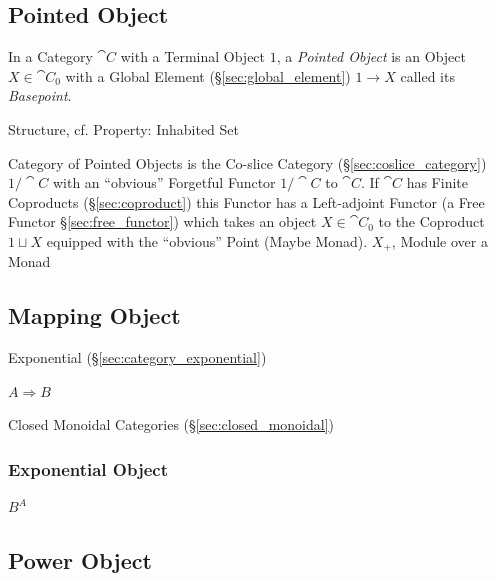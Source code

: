 \subsection{Pointed Object}\label{sec:pointed_object}

In a Category $\cat{C}$ with a Terminal Object $1$, a \emph{Pointed Object} is
an Object $X \in \cat{C}_0$ with a Global Element (\S\ref{sec:global_element})
$1 \rightarrow X$ called its \emph{Basepoint}.

Structure, cf. Property: Inhabited Set %

Category of Pointed Objects is the Co-slice Category
(\S\ref{sec:coslice_category}) $1/\cat{C}$ with an ``obvious'' Forgetful
Functor $1 / \cat{C}$ to $\cat{C}$. If $\cat{C}$ has Finite Coproducts
(\S\ref{sec:coproduct}) this Functor has a Left-adjoint Functor (a Free Functor
\S\ref{sec:free_functor}) which takes an object $X \in \cat{C}_0$ to the
Coproduct $1 \sqcup X$ equipped with the ``obvious'' Point (Maybe Monad).
$X_+$, Module over a Monad %



\subsection{Mapping Object}\label{sec:mapping_object}

Exponential (\S\ref{sec:category_exponential})

$A \Rightarrow B$

Closed Monoidal Categories (\S\ref{sec:closed_monoidal})



\subsubsection{Exponential Object}\label{sec:exponential_object}

$B^A$



\subsection{Power Object}\label{sec:power_object}

